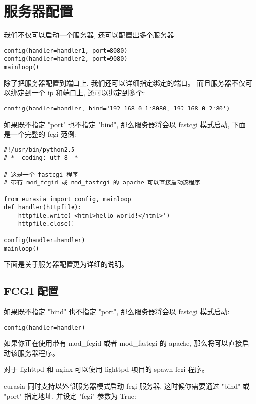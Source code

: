 \documentclass{manual}
\begin{document}
\section{服务器配置}

我们不仅可以启动一个服务器, 还可以配置出多个服务器:

\begin{verbatim}
config(handler=handler1, port=8080)
config(handler=handler2, port=9080)
mainloop()
\end{verbatim}

除了把服务器配置到端口上, 我们还可以详细指定绑定的端口。
而且服务器不仅可以绑定到一个 ip 和端口上, 还可以绑定到多个:

\begin{verbatim}
config(handler=handler, bind='192.168.0.1:8080, 192.168.0.2:80')
\end{verbatim}

如果既不指定 "port" 也不指定 "bind", 那么服务器将会以 fastcgi 模式启动,
下面是一个完整的 fcgi 范例:

\begin{verbatim}
#!/usr/bin/python2.5
#-*- coding: utf-8 -*-

# 这是一个 fastcgi 程序
# 带有 mod_fcgid 或 mod_fastcgi 的 apache 可以直接启动该程序

from eurasia import config, mainloop
def handler(httpfile):
	httpfile.write('<html>hello world!</html>')
	httpfile.close()

config(handler=handler)
mainloop()
\end{verbatim}

下面是关于服务器配置更为详细的说明。

\subsection{FCGI 配置}

如果既不指定 "bind" 也不指定 "port", 那么服务器将会以 fastcgi 模式启动:

\begin{verbatim}
config(handler=handler)
\end{verbatim}

如果你正在使用带有 mod_fcgid 或者 mod_fastcgi 的 apache,
那么将可以直接启动该服务器程序。

对于 lighttpd 和 nginx 可以使用 lighttpd 项目的 spawn-fcgi 程序。

eurasia 同时支持以外部服务器模式启动 fcgi 服务器,
这时候你需要通过 "bind" 或 "port" 指定地址,
并设定 "fcgi" 参数为 True:
\end{document}
